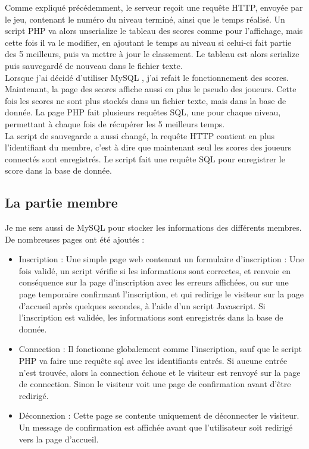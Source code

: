 \documentclass[12pt]{article}
\begin{document}
Comme expliqué précédemment, le serveur reçoit une requête HTTP, envoyée par le jeu, contenant le numéro du niveau terminé, ainsi que le temps réalisé. Un script PHP va alors unserialize le tableau des scores comme pour l'affichage, mais cette fois il va le modifier, en ajoutant le temps au niveau si celui-ci fait partie des 5 meilleurs, puis va mettre à jour le classement. Le tableau est alors \gls{serialize} puis sauvegardé de nouveau dans le fichier texte.\\

Lorsque j'ai décidé d'utiliser MySQL \cite{mysql}, j'ai refait le fonctionnement des scores. Maintenant, la page des scores affiche aussi en plus le pseudo des joueurs. Cette fois les scores ne sont plus stockés dans un fichier texte, mais dans la base de donnée. La page PHP fait plusieurs requêtes \gls{SQL}, une pour chaque niveau, permettant à chaque fois de récupérer les 5 meilleurs temps.\\
La script de sauvegarde a aussi changé, la requête HTTP contient en plus l'identifiant du membre, c'est à dire que maintenant seul les scores des joueurs connectés sont enregistrés. Le script fait une requête SQL pour enregistrer le score dans la base de donnée.

\newpage

\subsection{La partie membre}

Je me sers aussi de MySQL pour stocker les informations des différents membres. De nombreuses pages ont été ajoutés :
\begin{itemize}
\item Inscription : Une simple page web contenant un formulaire d'inscription : Une fois validé, un script vérifie si les informations sont correctes, et renvoie en conséquence sur la page d'inscription avec les erreurs affichées, ou sur une page temporaire confirmant l'inscription, et qui redirige le visiteur sur la page d'accueil après quelques secondes, à l'aide d'un script \gls{Javascript}. Si l'inscription est validée, les informations sont enregistrés dans la base de donnée.
\item Connection : Il fonctionne globalement comme l'inscription, sauf que le script PHP va faire une requête sql avec les identifiants entrés. Si aucune entrée n'est trouvée, alors la connection échoue et le visiteur est renvoyé sur la page de connection. Sinon le visiteur voit une page de confirmation avant d'être redirigé.
\item Déconnexion : Cette page se contente uniquement de déconnecter le visiteur. Un message de confirmation est affichée avant que l'utilisateur soit redirigé vers la page d'accueil.
\end{itemize}
\end{document}
